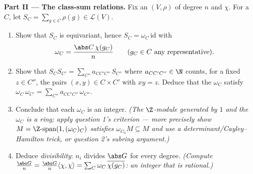 \begin{problem}
\medskip
\noindent\textbf{Part II --- The class-sum relations.} Fix an
 $(V, \rho)$ of degree $n$ and  $\chi$. For a
 $C$, let $S_C = \sum_{g \in C}\rho(g) \in
\mathcal L(V)$.
\begin{enumerate}[resume]
  \item Show that $S_C$ is equivariant, hence $S_C =
        \omega_C\,\mathrm{id}$ with
        \[
        \omega_C = \frac{\abs C\,\chi(g_C)}{n}
        \qquad (g_C \in C \text{ any representative}).
        \]
  \item Show that $S_CS_{C'} = \sum_{C''}
        a_{CC'C''}\,S_{C''}$ where $a_{CC'C''} \in \N$ counts,
        for a fixed $z \in C''$, the pairs $(x, y) \in C \times
        C'$ with $xy = z$. Deduce that the $\omega_C$ satisfy
        $\omega_C\,\omega_{C'} = \sum_{C''}
        a_{CC'C''}\,\omega_{C''}$.
  \item Conclude that each $\omega_C$ is an  integer.
        \emph{(The $\Z$-module generated by $1$ and the
        $\omega_C$ is a  ring; apply question
        1's criterion --- more precisely show $M = \Z\text{-span}
        (1, (\omega_C)_C)$ satisfies $\omega_{C_0} M \subseteq
        M$ and use a determinant/Cayley--Hamilton trick, or
        question 2's subring argument.)}
  \item Deduce \emph{ divisibility}: $n_i$ divides
        $\abs G$ for every  degree.
        \emph{(Compute $\frac{\abs G}{n} = \frac{\abs G}{n}
        \langle\chi,\chi\rangle = \sum_C \omega_C\,
        \overline{\chi(g_C)}$: an  integer that is
        rational.)}
\end{enumerate}


\end{problem}
